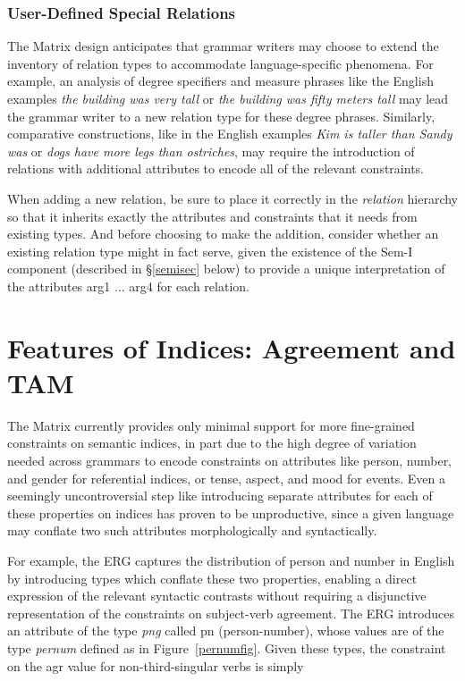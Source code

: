 \documentclass[12pt]{article}
\begin{document}
\subsubsection{User-Defined Special Relations}

The Matrix design anticipates that grammar writers may choose to extend the
inventory of relation types to accommodate language-specific phenomena.  For
example, an analysis of degree specifiers and measure phrases like the 
English examples {\it the building was very tall} or {\it the building was 
fifty meters tall} may lead the grammar writer to a new relation type for
these degree phrases.  Similarly, comparative constructions, like in the 
English examples {\it Kim is taller than Sandy was} or {\it dogs have more
legs than ostriches}, may require the introduction of relations with 
additional attributes to encode all of the relevant constraints.  

When adding a new relation, be sure to place it correctly in the {\it relation}
hierarchy so that it inherits exactly the attributes and constraints that it
needs from existing types.  And before choosing to make the addition, consider
whether an existing relation type might in fact serve, given the existence of
the Sem-I component (described in \S\ref{semisec} below) to provide a unique
interpretation of the attributes {\sc arg1 ... arg4} for each relation.

\section{Features of Indices: Agreement and TAM}
\label{AgrTAM}

The Matrix currently provides only minimal support for more fine-grained
constraints on semantic indices, in part due to the high degree of variation
needed across grammars to encode constraints on attributes like person, number,
and gender for referential indices, or tense, aspect, and mood for events.
Even a seemingly uncontroversial step like introducing separate attributes for 
each of these properties on indices has proven to be unproductive, since
a given language may conflate two such attributes morphologically and
syntactically.

For example, the ERG captures the distribution of person and number in English
by introducing types which conflate these two properties, enabling a direct
expression of the relevant syntactic contrasts without requiring a disjunctive
representation of the constraints on subject-verb agreement.  The ERG 
introduces an attribute of the type {\it png} called {\sc pn} (person-number),
whose values are of the type {\it pernum} defined as in Figure~\ref{pernumfig}.
Given these types, the constraint on the {\sc agr} value for
non-third-singular verbs is simply\\
\end{document}

